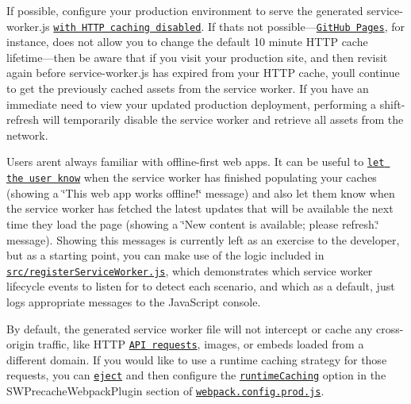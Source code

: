 \begin{DoxyEnumerate}
\item If possible, configure your production environment to serve the generated {\ttfamily service-\/worker.\+js} \href{http://stackoverflow.com/questions/38843970/service-worker-javascript-update-frequency-every-24-hours}{\tt with H\+T\+TP caching disabled}. If that\textquotesingle{}s not possible—\href{#github-pages}{\tt Git\+Hub Pages}, for instance, does not allow you to change the default 10 minute H\+T\+TP cache lifetime—then be aware that if you visit your production site, and then revisit again before {\ttfamily service-\/worker.\+js} has expired from your H\+T\+TP cache, you\textquotesingle{}ll continue to get the previously cached assets from the service worker. If you have an immediate need to view your updated production deployment, performing a shift-\/refresh will temporarily disable the service worker and retrieve all assets from the network.
\end{DoxyEnumerate}
\begin{DoxyEnumerate}
\item Users aren\textquotesingle{}t always familiar with offline-\/first web apps. It can be useful to \href{https://developers.google.com/web/fundamentals/instant-and-offline/offline-ux#inform_the_user_when_the_app_is_ready_for_offline_consumption}{\tt let the user know} when the service worker has finished populating your caches (showing a \char`\"{}\+This web
app works offline!\char`\"{} message) and also let them know when the service worker has fetched the latest updates that will be available the next time they load the page (showing a \char`\"{}\+New content is available; please refresh.\char`\"{} message). Showing this messages is currently left as an exercise to the developer, but as a starting point, you can make use of the logic included in \href{src/registerServiceWorker.js}{\tt {\ttfamily src/register\+Service\+Worker.\+js}}, which demonstrates which service worker lifecycle events to listen for to detect each scenario, and which as a default, just logs appropriate messages to the Java\+Script console.
\end{DoxyEnumerate}
\begin{DoxyEnumerate}
\item By default, the generated service worker file will not intercept or cache any cross-\/origin traffic, like H\+T\+TP \href{#integrating-with-an-api-backend}{\tt A\+PI requests}, images, or embeds loaded from a different domain. If you would like to use a runtime caching strategy for those requests, you can \href{#npm-run-eject}{\tt {\ttfamily eject}} and then configure the \href{https://github.com/GoogleChrome/sw-precache#runtimecaching-arrayobject}{\tt {\ttfamily runtime\+Caching}} option in the {\ttfamily S\+W\+Precache\+Webpack\+Plugin} section of \href{../config/webpack.config.prod.js}{\tt {\ttfamily webpack.\+config.\+prod.\+js}}.
\end{DoxyEnumerate}

